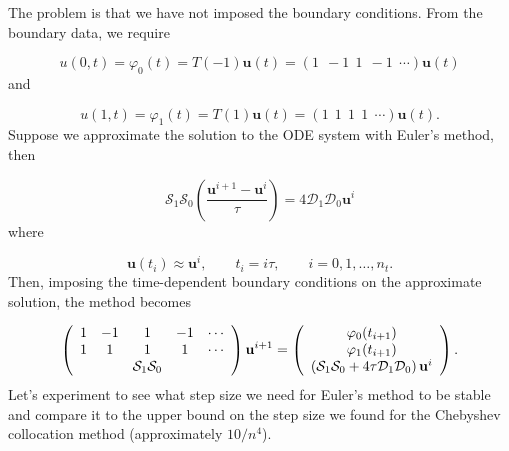 \documentclass[12pt,a4paper]{article}
\begin{document}
The problem is that we have not imposed the boundary conditions.  From the boundary data, we require

\[
u(0,t) = \varphi_0(t) = T(-1)\mathbf{u}(t) = \left(1 \:\: -1 \:\: 1 \:\: -1 \:\: \cdots    \right)\mathbf{u}(t)
\]
and

\[
u(1,t) = \varphi_1(t) = T(1)\mathbf{u}(t) = \left(1 \:\: 1 \:\: 1 \:\: 1 \:\: \cdots    \right)\mathbf{u}(t).
\]
Suppose we approximate the solution to the ODE system with Euler's method, then

\[
\mathcal{S}_1\mathcal{S}_0\left(\frac{\mathbf{u}^{i+1} - \mathbf{u}^i}{\tau}  \right) = 4 \mathcal{D}_1\mathcal{D}_0\mathbf{u}^i
\]
where

\[
\mathbf{u}(t_i) \approx \mathbf{u}^i, \qquad t_i = i\tau, \qquad i = 0, 1, \ldots, n_t. 
\]
Then, imposing the time-dependent boundary conditions on the approximate solution, the method becomes

\[
\left(
\begin{array}{c c c c c}
1 & -1 & 1 & -1 & \cdots \\
1 & 1  & 1 &  1 & \cdots \\
 & &\mathcal{S}_1\mathcal{S}_0 & &
\end{array}
\right)
\mathbf{u}^{i+1} = 
\left(
\begin{array}{c}
\varphi_0(t_{i+1}) \\
\varphi_1(t_{i+1}) \\
\left(\mathcal{S}_1\mathcal{S}_0 +4\tau \mathcal{D}_1\mathcal{D}_0 \right)\mathbf{u}^i
\end{array}
\right).
\]
Let's experiment to see what step size we need for Euler's method to be stable and compare it to the upper bound on the step size we found for the Chebyshev collocation method (approximately $10/n^4$).
\end{document}
